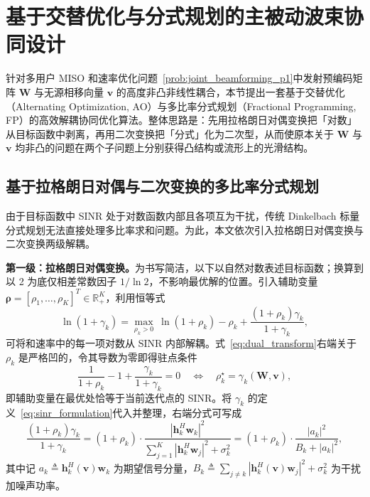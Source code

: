 \section{基于交替优化与分式规划的主被动波束协同设计}
\label{sec:beamforming_optimization}

针对多用户 MISO 和速率优化问题~\eqref{prob:joint_beamforming_p1}中发射预编码矩阵 $\bm{W}$ 与无源相移向量 $\bm{v}$ 的高度非凸非线性耦合，本节提出一套基于交替优化（Alternating Optimization, AO）与多比率分式规划（Fractional Programming, FP）的高效解耦协同优化算法。整体思路是：先用拉格朗日对偶变换把「对数」从目标函数中剥离，再用二次变换把「分式」化为二次型，从而使原本关于 $\bm{W}$ 与 $\bm{v}$ 均非凸的问题在两个子问题上分别获得凸结构或流形上的光滑结构。

\subsection{基于拉格朗日对偶与二次变换的多比率分式规划}
\label{sec:fp_transform}

由于目标函数中 SINR 处于对数函数内部且各项互为干扰，传统 Dinkelbach 标量分式规划无法直接处理多比率求和问题。为此，本文依次引入拉格朗日对偶变换与二次变换两级解耦。

\textbf{第一级：拉格朗日对偶变换。}为书写简洁，以下以自然对数表述目标函数；换算到以 2 为底仅相差常数因子 $1/\ln 2$，不影响最优解的位置。引入辅助变量 $\bm{\rho} = [\rho_1, \dots, \rho_K]^T \in \mathbb{R}_{+}^K$，利用恒等式
\begin{equation}
  \ln\left(1 + \gamma_k\right) = \max_{\rho_k > 0}\ \ln(1+\rho_k) - \rho_k + \frac{(1+\rho_k)\gamma_k}{1+\gamma_k},
  \label{eq:dual_transform}
\end{equation}
可将和速率中的每一项对数从 SINR 内部解耦。式~\eqref{eq:dual_transform}右端关于 $\rho_k$ 是严格凹的，令其导数为零即得驻点条件
\begin{equation}
  \frac{1}{1+\rho_k} - 1 + \frac{\gamma_k}{1+\gamma_k} = 0
  \quad\Longleftrightarrow\quad
  \rho_k^{\star} = \gamma_k(\bm{W}, \bm{v}),
  \label{eq:fp_update_rho}
\end{equation}
即辅助变量在最优处恰等于当前迭代点的 SINR。将 $\gamma_k$ 的定义~\eqref{eq:sinr_formulation}代入并整理，右端分式可写成
\begin{equation}
  \frac{(1+\rho_k)\gamma_k}{1+\gamma_k}
  = (1+\rho_k)\cdot\frac{|\bm{h}_k^H\bm{w}_k|^2}{\sum_{j=1}^{K}|\bm{h}_k^H\bm{w}_j|^2 + \sigma_k^2}
  = (1+\rho_k)\cdot\frac{|a_k|^2}{B_k + |a_k|^2},
  \label{eq:qt_transform}
\end{equation}
其中记 $a_k \triangleq \bm{h}_k^H(\bm{v})\bm{w}_k$ 为期望信号分量，$B_k \triangleq \sum_{j\neq k}|\bm{h}_k^H(\bm{v})\bm{w}_j|^2 + \sigma_k^2$ 为干扰加噪声功率。

